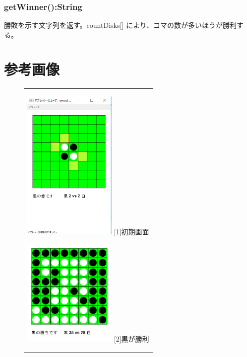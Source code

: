 \documentclass[10.5pt, a4paper]{jsarticle}
\begin{document}
\subsubsection*{getWinner():String}

勝敗を示す文字列を返す。countDisks[] により、コマの数が多いほうが勝利する。

\newpage

\section{参考画像}

\begin{figure}[htbp]
  \begin{center}
    \begin{tabular}{c}

      \begin{minipage}{0.33\hsize}
        \begin{center}
          \includegraphics[clip, width=4.5cm]{./image/img01.png}
          \hspace{1.6cm} [1]初期画面
        \end{center}
      \end{minipage}

      \begin{minipage}{0.33\hsize}
        \begin{center}
            \includegraphics[clip, width=4.5cm]{./image/img02.png}
          \hspace{1.6cm} [2]黒が勝利
        \end{center}
      \end{minipage}


\end{tabular}
\end{center}
\end{figure}
\end{document}
